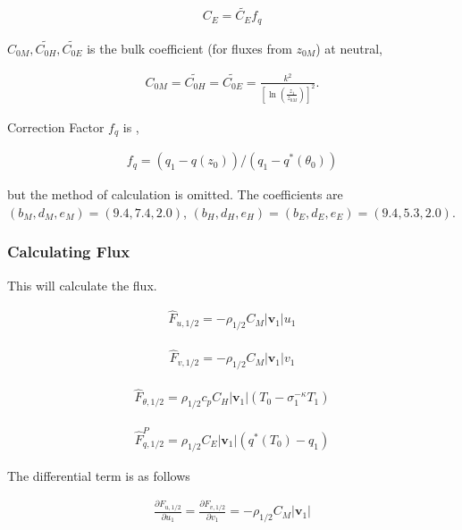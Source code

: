 \begin{eqnarray}
C_E = \widetilde{C_E} f_q
\end{eqnarray}

\(C_{0M}, \widetilde{C_{0H}}, \widetilde{C_{0E}}\) is the bulk
coefficient (for fluxes from \(z_{0M}\)) at neutral,

\begin{eqnarray}
C_{0M}  =  \widetilde{C_{0H}}  =  \widetilde{C_{0E}}  =
       \frac{k^2}{\left[\ln \left(\frac{z_1}{z_{0M}}\right)\right]^2 } .
\end{eqnarray}

Correction Factor \(f_q\) is ,

\begin{eqnarray}
  f_q = (q_1 - q(z_0))/(q_1 - q^{\ast}(\theta_0))
\end{eqnarray}

but the method of calculation is omitted. The coefficients are
\(( b_M, d_M, e_M ) = ( 9.4, 7.4, 2.0 )\),
\(( b_H, d_H, e_H ) = ( b_E, d_E, e_E ) = ( 9.4, 5.3, 2.0 )\).

\hypertarget{calculating-flux}{%
\subsubsection{Calculating Flux}\label{calculating-flux}}

This will calculate the flux.

\begin{eqnarray}
\hat{F}_{u,1/2}  =  - \rho_{1/2} C_M |{\mathbf{v}}_1| u_1
\end{eqnarray}

\begin{eqnarray}
\hat{F}_{v,1/2}  =  - \rho_{1/2} C_M |{\mathbf{v}}_1| v_1
\end{eqnarray}

\begin{eqnarray}
\hat{F}_{\theta,1/2}  = \rho_{1/2} c_p C_H |{\mathbf{v}}_1|
                    \left( T_0 - \sigma_1^{-\kappa} T_1 \right)
\end{eqnarray}

\begin{eqnarray}
\hat{F}_{q,1/2}^P  =  \rho_{1/2} C_E |{\mathbf{v}}_1|
                    \left( q^*(T_0) - q_1 \right)
\end{eqnarray}

The differential term is as follows

\begin{eqnarray}
\frac{\partial{F_{u,1/2}}}{\partial {u_1}} = \frac{\partial{F_{v,1/2}}}{\partial {v_1}}
= - \rho_{1/2} C_M |{\mathbf{v}}_1|
\end{eqnarray}

